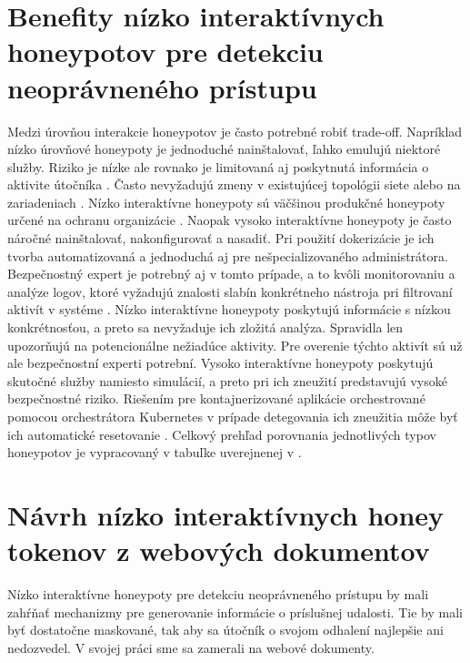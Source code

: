 \documentclass[conference, 11pt,slovak,a4paper,twoside]{IEEEtran}
\begin{document}
\section{Benefity nízko interaktívnych honeypotov pre detekciu neoprávneného prístupu} \label{benefitsOfLowInteractionHoneyTokens}

Medzi úrovňou interakcie honeypotov je často potrebné robiť trade-off. Napríklad nízko úrovňové honeypoty je jednoduché nainštalovať, ľahko emulujú niektoré služby. Riziko je nízke ale rovnako je limitovaná aj poskytnutá informácia o aktivite útočníka \cite{spitzner_honeypots_2002}. Často nevyžadujú zmeny v existujúcej topológii siete alebo na zariadeniach \cite{scada_2014}. Nízko interaktívne honeypoty sú väčšinou produkčné honeypoty určené na ochranu organizácie \cite{spitzner_honeypots_2002}. Naopak vysoko interaktívne honeypoty je často náročné nainštalovať, nakonfigurovať a nasadiť. Pri použití dokerizácie je ich tvorba automatizovaná a jednoduchá aj pre nešpecializovaného administrátora. Bezpečnostný expert je potrebný aj v tomto prípade, a to kvôli monitorovaniu a analýze logov, ktoré vyžadujú znalosti slabín konkrétneho nástroja pri filtrovaní aktivít v systéme \cite{valicek_creation_2017}. Nízko interaktívne honeypoty poskytujú informácie s nízkou konkrétnosťou, a preto sa nevyžaduje ich zložitá analýza. Spravidla len upozorňujú na potencionálne nežiadúce aktivity. Pre overenie týchto aktivít sú už ale bezpečnostní experti potrební. Vysoko interaktívne honeypoty poskytujú skutočné služby namiesto simulácií, a preto pri ich zneužití predstavujú vysoké bezpečnostné riziko. Riešením pre kontajnerizované aplikácie orchestrované pomocou orchestrátora Kubernetes v prípade detegovania ich zneužitia môže byť ich automatické resetovanie \cite{reti_escape_2021}. Celkový prehľad porovnania jednotlivých typov honeypotov je vypracovaný v tabuľke uverejnenej v \cite{nagpal_catch_2015}. 



\section{Návrh nízko interaktívnych honey tokenov z webových dokumentov} \label{designOfLowInteractiveHoneyToken}

Nízko interaktívne honeypoty pre detekciu neoprávneného prístupu by mali zahŕňať mechanizmy pre generovanie informácie o príslušnej udalosti. Tie by mali byť dostatočne maskované, tak aby sa útočník o svojom odhalení najlepšie ani nedozvedel. V svojej práci sme sa zamerali na webové dokumenty. 
\end{document}
